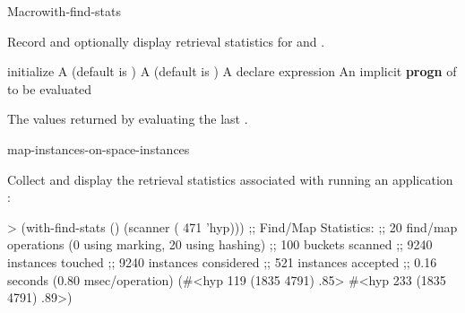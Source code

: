 \documentclass[10pt,twoside,english,pdftex]{article}
\begin{document}

\begin{functiondoc}{Macro}{with-find-stats}%
  {\code{(} \code{)}
    \superstar{}
    \superstar{} 
    \returns{} \superstar}
%
%
%
%
  
\fnsyntax

\fnpurpose 
{}%
%
Record and optionally display retrieval statistics for 
\textbf{} and
\textbf{}.

\fnpackage {}

\fnmodule {}

\fnargs
\begin{args}{initialize}
\arg[initialize] A (default is )
\arg[report] A (default is )
\arg[declaration] A declare expression
\arg[forms] An implicit \textbf{progn} of  to be evaluated
\end{args}

\fnreturns The values returned by evaluating the last .

\begin{alsos}{map-instances-on-space-instances}
\end{alsos}

\fnexample
{}%
Collect and display the retrieval statistics associated with
running an application  :
\begin{example}
> (with-find-stats ()
     (scanner ( 471 'hyp)))
;; Find/Map Statistics:
;;        20 find/map operations (0 using marking, 20 using hashing)
;;       100 buckets scanned
;;      9240 instances touched
;;      9240 instances considered
;;       521 instances accepted
;;      0.16 seconds (0.80 msec/operation)
(#<hyp 119 (1835 4791) .85>
 #<hyp 233 (1835 4791) .89>)
\end{example}

\end{functiondoc}
\end{document}
